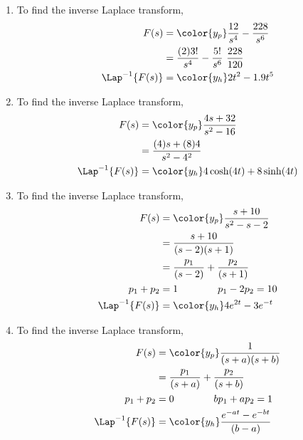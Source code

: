 \begin{enumerate}
      \item To find the inverse Laplace transform,
            \begin{align}
                  F(s)              & = \color{y_p} \frac{12}{s^4} - \frac{228}{s^6} \\
                                    & = \frac{(2)3!}{s^4}
                  - \frac{5!}{s^6}\ \frac{228}{120}                                  \\
                  \Lap^{-1}\{F(s)\} & = \color{y_h} 2t^2 - 1.9t^5
            \end{align}

      \item To find the inverse Laplace transform,
            \begin{align}
                  F(s)              & = \color{y_p} \frac{4s + 32}{s^2 - 16} \\
                                    & = \frac{(4)s + (8)4}{s^2 - 4^2}        \\
                  \Lap^{-1}\{F(s)\} & = \color{y_h} 4\cosh(4t) + 8\sinh(4t)
            \end{align}

      \item To find the inverse Laplace transform,
            \begin{align}
                  F(s)              & = \color{y_p} \frac{s + 10}{s^2 - s - 2} \\
                                    & = \frac{s+10}{(s-2)(s+1)}                \\
                                    & = \frac{p_1}{(s-2)} + \frac{p_2}{(s+1)}  \\
                  p_1 + p_2         & = 1 \qquad\qquad p_1 - 2p_2 = 10         \\
                  \Lap^{-1}\{F(s)\} & = \color{y_h} 4e^{2t} - 3e^{-t}
            \end{align}

      \item To find the inverse Laplace transform,
            \begin{align}
                  F(s)              & = \color{y_p} \frac{1}{(s+a)(s+b)}            \\
                                    & = \frac{p_1}{(s+a)} + \frac{p_2}{(s+b)}       \\
                  p_1 + p_2         & = 0 \qquad\qquad bp_1 + ap_2 = 1              \\
                  \Lap^{-1}\{F(s)\} & = \color{y_h} \frac{e^{-at} - e^{-bt}}{(b-a)}
            \end{align}


\end{enumerate}
